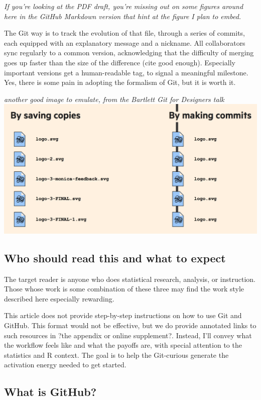 \documentclass[12pt]{article}
\begin{document}
\emph{If you're looking at the PDF draft, you're missing out on some
figures around here in the GitHub Markdown version that hint at the
figure I plan to embed.}

The Git way is to track the evolution of that file, through a series of
commits, each equipped with an explanatory message and a nickname. All
collaborators sync regularly to a common version, acknowledging that the
difficulty of merging goes up faster than the size of the difference
(cite good enough). Especially important versions get a human-readable
tag, to signal a meaningful milestone. Yes, there is some pain in
adopting the formalism of Git, but it is worth it.

\emph{another good image to emulate, from the Bartlett Git for Designers
talk} \includegraphics{bartlett-copies-vs-commits.png}

\subsection{Who should read this and what to
expect}\label{who-should-read-this-and-what-to-expect}

The target reader is anyone who does statistical research, analysis, or
instruction. Those whose work is some combination of these three may
find the work style described here especially rewarding.

This article does not provide step-by-step instructions on how to use
Git and GitHub. This format would not be effective, but we do provide
annotated links to such resources in ?the appendix or online
supplement?. Instead, I'll convey what the workflow feels like and what
the payoffs are, with special attention to the statistics and R context.
The goal is to help the Git-curious generate the activation energy
needed to get started.

\subsection{What is GitHub?}\label{what-is-github}
\end{document}
